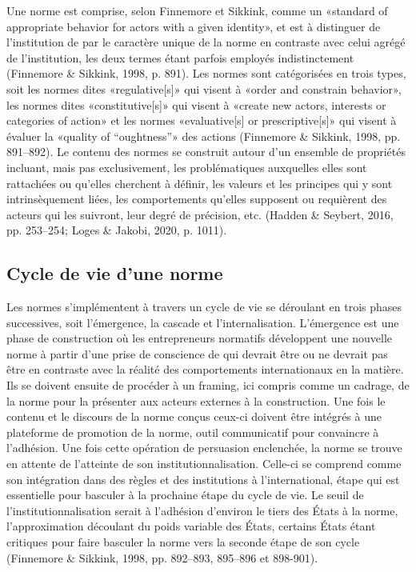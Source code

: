 \documentclass[12pt]{ulaval}
\begin{document}
Une norme est comprise, selon Finnemore et Sikkink, comme un «standard of appropriate behavior for actors with a given identity», et est à distinguer de l'institution de par le caractère unique de la norme en contraste avec celui agrégé de l'institution, les deux termes étant parfois employés indistinctement (Finnemore \& Sikkink, 1998, p. 891). Les normes sont catégorisées en trois types, soit les normes dites «regulative{[}s{]}» qui visent à «order and constrain behavior», les normes dites «constitutive{[}s{]}» qui visent à «create new actors, interests or categories of action» et les normes «evaluative{[}s{]} or prescriptive{[}s{]}» qui visent à évaluer la «quality of ``oughtness''» des actions (Finnemore \& Sikkink, 1998, pp. 891--892). Le contenu des normes se construit autour d'un ensemble de propriétés incluant, mais pas exclusivement, les problématiques auxquelles elles sont rattachées ou qu'elles cherchent à définir, les valeurs et les principes qui y sont intrinsèquement liées, les comportements qu'elles supposent ou requièrent des acteurs qui les suivront, leur degré de précision, etc. (Hadden \& Seybert, 2016, pp. 253--254; Loges \& Jakobi, 2020, p. 1011).

\subsection{Cycle de vie d'une norme}\label{cycle-de-vie-dune-norme}

Les normes s'implémentent à travers un cycle de vie se déroulant en trois phases successives, soit l'émergence, la cascade et l'internalisation. L'émergence est une phase de construction où les entrepreneurs normatifs développent une nouvelle norme à partir d'une prise de conscience de qui devrait être ou ne devrait pas être en contraste avec la réalité des comportements internationaux en la matière. Ils se doivent ensuite de procéder à un framing, ici compris comme un cadrage, de la norme pour la présenter aux acteurs externes à la construction. Une fois le contenu et le discours de la norme conçus ceux-ci doivent être intégrés à une plateforme de promotion de la norme, outil communicatif pour convaincre à l'adhésion. Une fois cette opération de persuasion enclenchée, la norme se trouve en attente de l'atteinte de son institutionnalisation. Celle-ci se comprend comme son intégration dans des règles et des institutions à l'international, étape qui est essentielle pour basculer à la prochaine étape du cycle de vie. Le seuil de l'institutionnalisation serait à l'adhésion d'environ le tiers des États à la norme, l'approximation découlant du poids variable des États, certains États étant critiques pour faire basculer la norme vers la seconde étape de son cycle (Finnemore \& Sikkink, 1998, pp. 892--893, 895--896 et 898-901).
\end{document}
